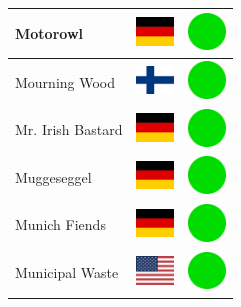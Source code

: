 \documentclass[12pt, a4paper, twoside]{report}
\begin{document}
\begin{center}
\begin{longtable}{|p{5cm}|p{2cm}|p{2cm}|}
 Motorowl                                                   & \includegraphics[width=1cm]{../img/flags/de} &   \includegraphics[width=1cm]{../likes/y} \\ \hline
 Mourning Wood                                              & \includegraphics[width=1cm]{../img/flags/fi} &   \includegraphics[width=1cm]{../likes/y} \\ \hline
 Mr. Irish Bastard                                          & \includegraphics[width=1cm]{../img/flags/de} &   \includegraphics[width=1cm]{../likes/y} \\ \hline
 Muggeseggel                                                & \includegraphics[width=1cm]{../img/flags/de} &   \includegraphics[width=1cm]{../likes/y} \\ \hline
 Munich Fiends                                              & \includegraphics[width=1cm]{../img/flags/de} &   \includegraphics[width=1cm]{../likes/y} \\ \hline
 Municipal Waste                                            & \includegraphics[width=1cm]{../img/flags/us} &   \includegraphics[width=1cm]{../likes/y} \\ \hline

\end{longtable}
\end{center}
\end{document}
